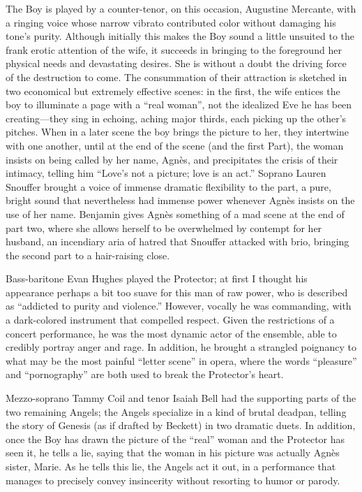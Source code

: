The Boy is played by a counter-tenor, on this occasion, Augustine Mercante, with a ringing voice whose narrow vibrato contributed color without damaging his tone’s purity. Although initially this makes the Boy sound a little unsuited to the frank erotic attention of the wife, it succeeds in bringing to the foreground her physical needs and devastating desires. She is without a doubt the driving force of the destruction to come. The consummation of their attraction is sketched in two economical but extremely effective scenes: in the first, the wife entices the boy to illuminate a page with a “real woman”, not the idealized Eve he has been creating—they sing in echoing, aching major thirds, each picking up the other’s pitches. When in a later scene the boy brings the picture to her, they intertwine with one another, until at the end of the scene (and the first Part), the woman insists on being called by her name, Agnès, and precipitates the crisis of their intimacy, telling him “Love’s not a picture; love is an act.” Soprano Lauren Snouffer brought a voice of immense dramatic flexibility to the part, a pure, bright sound that nevertheless had immense power whenever Agnès insists on the use of her name. Benjamin gives Agnès something of a mad scene at the end of part two, where she allows herself to be overwhelmed by contempt for her husband, an incendiary aria of hatred that Snouffer attacked with brio, bringing the second part to a hair-raising close.

Bass-baritone Evan Hughes played the Protector; at first I thought his appearance perhaps a bit too suave for this man of raw power, who is described as “addicted to purity and violence.” However, vocally he was commanding, with a dark-colored instrument that compelled respect. Given the restrictions of a concert performance, he was the most dynamic actor of the ensemble, able to credibly portray anger and rage. In addition, he brought a strangled poignancy to what may be the most painful “letter scene” in opera, where the words “pleasure” and “pornography” are both used to break the Protector’s heart.

Mezzo-soprano Tammy Coil and tenor Isaiah Bell had the supporting parts of the two remaining Angels; the Angels specialize in a kind of brutal deadpan, telling the story of Genesis (as if drafted by Beckett) in two dramatic duets. In addition, once the Boy has drawn the picture of the “real” woman and the Protector has seen it, he tells a lie, saying that the woman in his picture was actually Agnès sister, Marie. As he tells this lie, the Angels act it out, in a performance that manages to precisely convey insincerity without resorting to humor or parody.

